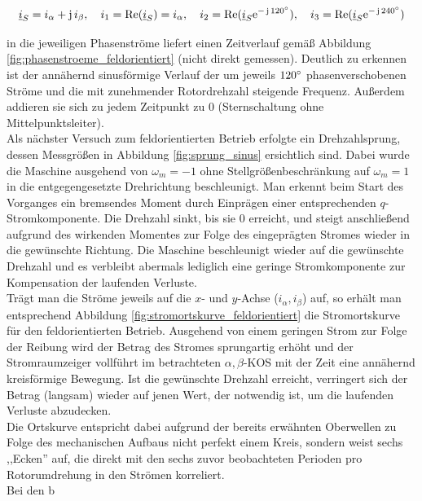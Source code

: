 \begin{equation}
    \underline{i}_{S} = i_{\alpha} + \operatorname{j}i_{\beta}, \quad i_1=\operatorname{Re}(\underline{i}_{S})=i_{\alpha}, \quad i_2=\operatorname{Re}(\underline{i}_{S} \mathrm{e}^{-\operatorname{j} 120 \degree}), \quad i_3=\operatorname{Re}(\underline{i}_{S} \mathrm{e}^{-\operatorname{j} 240 \degree})
    \label{eq:umrechnung}
\end{equation}

\noindent in die jeweiligen Phasenströme liefert einen Zeitverlauf gemäß Abbildung \ref{fig:phasenstroeme_feldorientiert} (nicht direkt gemessen). Deutlich zu erkennen ist der annähernd sinusförmige Verlauf der um jeweils $120 \degree$ phasenverschobenen Ströme und die mit zunehmender Rotordrehzahl steigende Frequenz. Außerdem addieren sie sich zu jedem Zeitpunkt zu 0 (Sternschaltung ohne Mittelpunktsleiter).\\ 
\noindent Als nächster Versuch zum feldorientierten Betrieb erfolgte ein Drehzahlsprung, dessen Messgrößen in Abbildung \ref{fig:sprung_sinus} ersichtlich sind. Dabei wurde die Maschine ausgehend von $\omega_m=-1$ ohne Stellgrößenbeschränkung auf $\omega_m=1$ in die entgegengesetzte Drehrichtung beschleunigt. Man erkennt beim Start des Vorganges ein bremsendes Moment durch Einprägen einer entsprechenden $q$-Stromkomponente. Die Drehzahl sinkt, bis sie 0 erreicht, und steigt anschließend aufgrund des wirkenden Momentes zur Folge des eingeprägten Stromes wieder in die gewünschte Richtung. Die Maschine beschleunigt wieder auf die gewünschte Drehzahl und es verbleibt abermals lediglich eine geringe Stromkomponente zur Kompensation der laufenden Verluste.\\ Trägt man die Ströme jeweils auf die $x$- und $y$-Achse ($i_{\alpha}, i_{\beta}$) auf, so erhält man entsprechend Abbildung \ref{fig:stromortskurve_feldorientiert} die Stromortskurve für den feldorientierten Betrieb. Ausgehend von einem geringen Strom zur Folge der Reibung wird der Betrag des Stromes sprungartig erhöht und der Stromraumzeiger vollführt im betrachteten $\alpha,\beta$-KOS mit der Zeit eine annähernd kreisförmige Bewegung. Ist die gewünschte Drehzahl erreicht, verringert sich der Betrag (langsam) wieder auf jenen Wert, der notwendig ist, um die laufenden Verluste abzudecken.\\
Die Ortskurve entspricht dabei aufgrund der bereits erwähnten Oberwellen zu Folge des mechanischen Aufbaus nicht perfekt einem Kreis, sondern weist sechs ,,Ecken'' auf, die direkt mit den sechs zuvor beobachteten Perioden pro Rotorumdrehung in den Strömen korreliert.\\
Bei den b

 
 
 
 
 
 
 
